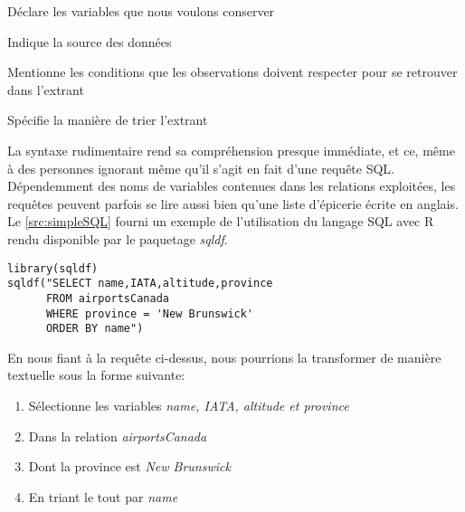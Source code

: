 \begin{description}[style=multiline,leftmargin=2cm]
	\item[Select] Déclare les variables que nous voulons conserver
	\item[From] Indique la source des données
	\item[Where] Mentionne les conditions que les observations doivent respecter pour se retrouver dans l'extrant
	\item[Order by] Spécifie la manière de trier l'extrant
\end{description}

\noindent
La syntaxe rudimentaire rend sa compréhension presque immédiate, et ce, même à des personnes ignorant même qu'il s'agit en fait d'une requête SQL. Dépendemment des noms de variables contenues dans les relations exploitées, les requêtes peuvent parfois se lire aussi bien qu'une liste d'épicerie écrite en anglais. Le \autoref{src:simpleSQL} fourni un exemple de l'utilisation du langage SQL avec R rendu disponible par le paquetage \emph{sqldf}.

\begin{lstlisting}[caption = Exemple de requête SQL,label=src:simpleSQL]
library(sqldf)
sqldf("SELECT name,IATA,altitude,province
      FROM airportsCanada
      WHERE province = 'New Brunswick'
      ORDER BY name")
\end{lstlisting}

\vspace{\baselineskip}
\noindent
En nous fiant à la requête ci-dessus, nous pourrions la transformer de manière textuelle sous la forme suivante:
\begin{enumerate}
	\item Sélectionne les variables \emph{name, IATA, altitude et province}
	\item Dans la relation \emph{airportsCanada}
	\item Dont la province est \emph{New Brunswick}
	\item En triant le tout par \emph{name}
\end{enumerate}

